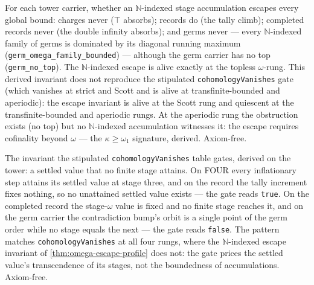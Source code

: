\begin{theorem}\label{thm:omega-escape-profile}\leanok{}
For each tower carrier, whether an $\mathbb{N}$-indexed stage accumulation
escapes every global bound: charges never ($\top$ absorbs); records do (the
tally climb); completed records never (the double infinity absorbs); and
germs never --- every $\mathbb{N}$-indexed family of germs is dominated by
its diagonal running maximum (\texttt{germ\_omega\_family\_bounded}) ---
although the germ carrier has no top (\texttt{germ\_no\_top}). The
$\mathbb{N}$-indexed escape is alive exactly at the topless $\omega$-rung.
This derived invariant does not reproduce the stipulated
\texttt{cohomologyVanishes} gate (which vanishes at strict and Scott and is
alive at transfinite-bounded and aperiodic): the escape invariant is alive
at the Scott rung and quiescent at the transfinite-bounded and aperiodic
rungs. At the aperiodic rung the obstruction exists (no top) but no
$\mathbb{N}$-indexed accumulation witnesses it: the escape requires
cofinality beyond $\omega$ --- the $\kappa \ge \omega_1$ signature, derived.
Axiom-free.
\end{theorem}

\begin{theorem}\label{thm:aperiodic-top-flux}\leanok{}
The invariant the stipulated \texttt{cohomologyVanishes} table gates,
derived on the tower: a settled value that no finite stage attains. On FOUR
every inflationary step attains its settled value at stage three, and on
the record the tally increment fixes nothing, so no unattained settled
value exists --- the gate reads \texttt{true}. On the completed record the
stage-$\omega$ value is fixed and no finite stage reaches it, and on the
germ carrier the contradiction bump's orbit is a single point of the germ
order while no stage equals the next --- the gate reads \texttt{false}.
The pattern matches \texttt{cohomologyVanishes} at all four rungs, where
the $\mathbb{N}$-indexed escape invariant of
\ref{thm:omega-escape-profile} does not: the gate prices the settled
value's transcendence of its stages, not the boundedness of accumulations.
Axiom-free.
\end{theorem}
